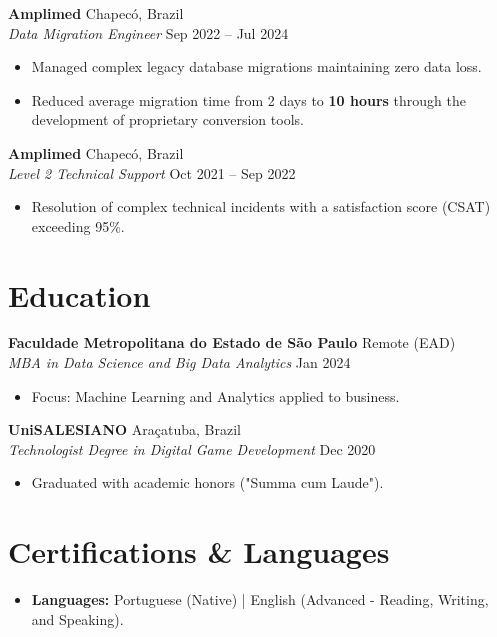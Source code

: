 \documentclass[a4paper,10pt]{article}
\begin{document}
\vspace{3pt}

\noindent \textbf{Amplimed} \hfill Chapecó, Brazil \\
\textit{Data Migration Engineer} \hfill Sep 2022 -- Jul 2024
\begin{itemize}[noitemsep, topsep=2pt]
    \item Managed complex legacy database migrations maintaining zero data loss.
    \item Reduced average migration time from 2 days to \textbf{10 hours} through the development of proprietary conversion tools.
\end{itemize}

\vspace{3pt}

\noindent \textbf{Amplimed} \hfill Chapecó, Brazil \\
\textit{Level 2 Technical Support} \hfill Oct 2021 -- Sep 2022
\begin{itemize}[noitemsep, topsep=2pt]
    \item Resolution of complex technical incidents with a satisfaction score (CSAT) exceeding 95\%.
\end{itemize}

\section{Education}

\noindent \textbf{Faculdade Metropolitana do Estado de São Paulo} \hfill Remote (EAD) \\
\textit{MBA in Data Science and Big Data Analytics} \hfill Jan 2024
\begin{itemize}[noitemsep, topsep=0pt]
    \item Focus: Machine Learning and Analytics applied to business.
\end{itemize}

\vspace{2pt}

\noindent \textbf{UniSALESIANO} \hfill Araçatuba, Brazil \\
\textit{Technologist Degree in Digital Game Development} \hfill Dec 2020
\begin{itemize}[noitemsep, topsep=0pt]
    \item Graduated with academic honors ("Summa cum Laude").
\end{itemize}

\section{Certifications \& Languages}
\begin{itemize}[noitemsep, leftmargin=*]
    \item \textbf{Languages:} Portuguese (Native) | English (Advanced - Reading, Writing, and Speaking).
\end{itemize}
\end{document}
